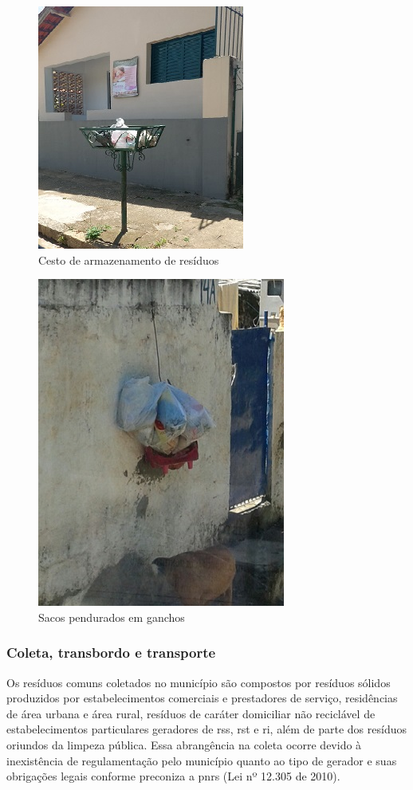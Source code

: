 \begin{figure}
	\centering
	\includegraphics[width=0.5\linewidth]{produtos/prodtres/image008}
	\caption{Cesto de armazenamento de resíduos}
	\label{fig:image008}
\end{figure}	


\begin{figure}
	\centering
	\includegraphics[width=0.5\linewidth]{produtos/prodtres/image009}
	\caption{Sacos pendurados em ganchos}
	\label{fig:image009}
\end{figure}


\subsubsection{Coleta, transbordo e transporte}

Os resíduos comuns coletados no município são compostos por resíduos sólidos produzidos por estabelecimentos comerciais e prestadores de serviço, residências de área urbana e área rural, resíduos de caráter domiciliar não reciclável de estabelecimentos particulares geradores de \gls{rss}, \gls{rst} e \gls{ri}, além de parte dos resíduos oriundos da limpeza pública. Essa abrangência na coleta ocorre devido à inexistência de regulamentação pelo município quanto ao tipo de gerador e suas obrigações legais conforme preconiza a \gls{pnrs} (Lei nº 12.305 de 2010).

